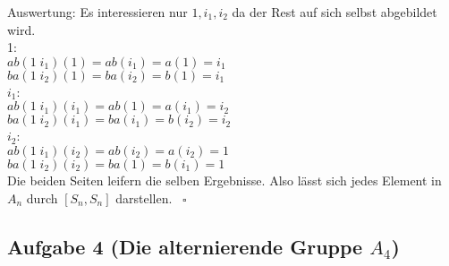 \documentclass[11pt,a4paper,ngerman]{article}
\begin{document}
Auswertung: Es interessieren nur $1, i_1, i_2$ da der Rest auf sich selbst abgebildet wird.\\
1:\\
$ab(1 \; i_1) (1) = ab (i_1) = a (1) = i_1$\\
$ba(1 \; i_2) (1) = ba (i_2) = b (1) = i_1$\\
\textbf{$i_1$}:\\
$ab(1 \; i_1) (i_1) = ab (1) = a (i_1) = i_2$\\
$ba(1 \; i_2) (i_1) = ba (i_1) = b (i_2) = i_2$\\
$i_2$:\\
$ab(1 \; i_1) (i_2) = ab (i_2) = a (i_2) = 1$\\
$ba(1 \; i_2) (i_2) = ba (1) = b(i_1) = 1$\\
Die beiden Seiten leifern die selben Ergebnisse. Also lässt sich jedes Element in $A_n$ durch $[S_n,S_n]$ darstellen.\
\mbox{} \hfill $\square$  


\subsection*{Aufgabe 4 \mdseries (Die alternierende Gruppe $A_4$)}
\end{document}
